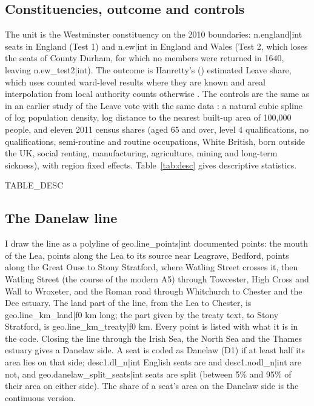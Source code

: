 \documentclass[11pt,a4paper]{article}
\begin{document}
\subsection{Constituencies, outcome and controls}
The unit is the Westminster constituency on the 2010 boundaries: {{n.england|int}} seats in England (Test 1) and {{n.ew|int}} in England and Wales (Test 2, which loses the seats of County Durham, for which no members were returned in 1640, leaving {{n.ew_test2|int}}). The outcome is Hanretty's (\citeyear{hanretty2017}) estimated Leave share, which uses counted ward-level results where they are known and areal interpolation from local authority counts otherwise \citep{parlitools}. The controls are the same as in an earlier study of the Leave vote with the same data \citep{hotham2026bl}: a natural cubic spline of log population density, log distance to the nearest built-up area of 100,000 people, and eleven 2011 census shares (aged 65 and over, level 4 qualifications, no qualifications, semi-routine and routine occupations, White British, born outside the UK, social renting, manufacturing, agriculture, mining and long-term sickness), with region fixed effects. Table~\ref{tab:desc} gives descriptive statistics.

{{TABLE_DESC}}

\subsection{The Danelaw line}
I draw the line as a polyline of {{geo.line_points|int}} documented points: the mouth of the Lea, points along the Lea to its source near Leagrave, Bedford, points along the Great Ouse to Stony Stratford, where Watling Street crosses it, then Watling Street (the course of the modern A5) through Towcester, High Cross and Wall to Wroxeter, and the Roman road through Whitchurch to Chester and the Dee estuary. The land part of the line, from the Lea to Chester, is {{geo.line_km_land|f0}} km long; the part given by the treaty text, to Stony Stratford, is {{geo.line_km_treaty|f0}} km. Every point is listed with what it is in the code. Closing the line through the Irish Sea, the North Sea and the Thames estuary gives a Danelaw side. A seat is coded as Danelaw (D1) if at least half its area lies on that side; {{desc1.dl_n|int}} English seats are and {{desc1.nodl_n|int}} are not, and {{geo.danelaw_split_seats|int}} seats are split (between 5\% and 95\% of their area on either side). The share of a seat's area on the Danelaw side is the continuous version.
\end{document}
